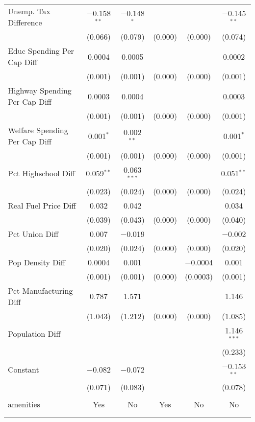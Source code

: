 \begin{table}[!htbp]
\begin{tabular}{@{\extracolsep{5pt}}lccccc}
  Unemp. Tax Difference & $-$0.158$^{**}$ & $-$0.148$^{*}$ &  &  & $-$0.145$^{**}$ \\ 
  & (0.066) & (0.079) & (0.000) & (0.000) & (0.074) \\ 
  Educ Spending Per Cap Diff & 0.0004 & 0.0005 &  &  & 0.0002 \\ 
  & (0.001) & (0.001) & (0.000) & (0.000) & (0.001) \\ 
  Highway Spending Per Cap Diff & 0.0003 & 0.0004 &  &  & 0.0003 \\ 
  & (0.001) & (0.001) & (0.000) & (0.000) & (0.001) \\ 
  Welfare Spending Per Cap Diff & 0.001$^{*}$ & 0.002$^{**}$ &  &  & 0.001$^{*}$ \\ 
  & (0.001) & (0.001) & (0.000) & (0.000) & (0.001) \\ 
  Pct Highschool Diff & 0.059$^{**}$ & 0.063$^{***}$ &  &  & 0.051$^{**}$ \\ 
  & (0.023) & (0.024) & (0.000) & (0.000) & (0.024) \\ 
  Real Fuel Price Diff & 0.032 & 0.042 &  &  & 0.034 \\ 
  & (0.039) & (0.043) & (0.000) & (0.000) & (0.040) \\ 
  Pct Union Diff & 0.007 & $-$0.019 &  &  & $-$0.002 \\ 
  & (0.020) & (0.024) & (0.000) & (0.000) & (0.020) \\ 
  Pop Density Diff & 0.0004 & 0.001 &  & $-$0.0004 & 0.001 \\ 
  & (0.001) & (0.001) & (0.000) & (0.0003) & (0.001) \\ 
  Pct Manufacturing Diff & 0.787 & 1.571 &  &  & 1.146 \\ 
  & (1.043) & (1.212) & (0.000) & (0.000) & (1.085) \\ 
  Population Diff &  &  &  &  & 1.146$^{***}$ \\ 
  &  &  &  &  & (0.233) \\ 
  Constant & $-$0.082 & $-$0.072 &  &  & $-$0.153$^{**}$ \\ 
  & (0.071) & (0.083) &  &  & (0.078) \\ 
 \hline \\[-1.8ex] 
amenities & Yes & No & Yes & No & No \\ 
\hline \\[-1.8ex] 
\hline 
\hline \\[-1.8ex] 
\end{tabular} 
\end{table} 
